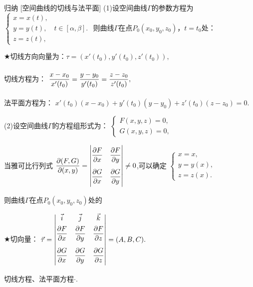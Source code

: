 \documentclass[a4paper,12pt,oneside,fontset=none]{ctexbook}
\let\olddfrac\dfrac
\renewcommand{\dfrac}[2]{
    \olddfrac{#1\vrule width 0pt height 1.15em depth 0em}{#2\vrule width 0pt height 0em depth 0.6em}
}
\newenvironment{induction}[1][]{\begin{thmBox}{归纳}{#1}}{\end{thmBox}}
\numberwithin{equation}{chapter}
\begin{document}
\begin{induction}
    [空间曲线的切线与法平面]
    (1)设空间曲线$\varGamma$的参数方程为
    $\begin{cases}
        x = x (t),\\
        y = y (t),\quad t\in[\alpha,\beta].\\
        z = z (t),
    \end{cases}$
    则曲线$\varGamma$在点$P_0(x_0,y_0,z_0)，t = t_0$处：
    
    $\bigstar$切线方向向量为：${\tau } = (x'(t_0),y'(t_0),z'(t_0)),$

    切线方程为：
    $\dfrac{x-x_0}{x'(t_0)} = \dfrac{y-y_0}{y'(t_0)} = \dfrac{z-z_0}{z'(t_0)},$

    法平面方程为：
    $x'(t_0)(x-x_0) + y'(t_0)(y-y_0) + z'(t_0)(z-z_0) = 0.$
    
    (2)设空间曲线$\varGamma$的方程组形式为：
    $\begin{cases}
        F(x,y,z) = 0,\\
        G(x,y,z) = 0,
    \end{cases}$
    
    当雅可比行列式
    $\dfrac{\partial(F,G)}{\partial(x,y)}  = \begin{vmatrix}
        \dfrac{\partial F}{\partial x} & \dfrac{\partial F}{\partial y} \\
        \dfrac{\partial G}{\partial x} & \dfrac{\partial G}{\partial y}
    \end{vmatrix} \neq 0$,可以确定
    $\begin{cases}
        x = x,\\
        y = y (x),\\
        z = z (x).
    \end{cases}$
    
    则曲线$\varGamma$在点$P_0(x_0,y_0,z_0)$处的
    
    $\bigstar$切向量：
    $\vec{\tau} = \begin{vmatrix}
        \vec{i} & \vec{j} & \vec{k} \\
        \dfrac{\partial F}{\partial x} & \dfrac{\partial F}{\partial y} & \dfrac{\partial F}{\partial z} \\
        \dfrac{\partial G}{\partial x} & \dfrac{\partial G}{\partial y} & \dfrac{\partial G}{\partial z}
    \end{vmatrix} = (A,B,C).$
    
    切线方程、法平面方程$\cdot$.
\end{induction}
\end{document}
